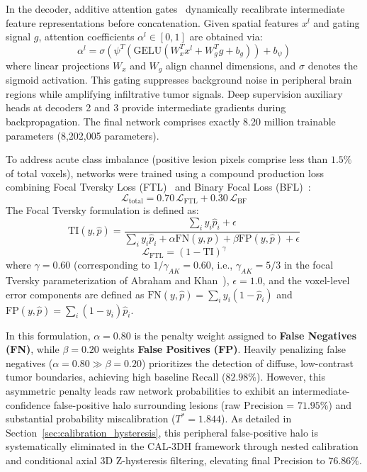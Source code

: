 \documentclass[11pt,a4paper]{article}
\begin{document}
In the decoder, additive attention gates~\cite{oktay2018attention} dynamically recalibrate intermediate feature representations before concatenation. Given spatial features $x^l$ and gating signal $g$, attention coefficients $\alpha^l \in [0, 1]$ are obtained via:
\begin{equation}
\alpha^l = \sigma\left(\psi^T \left(\text{GELU}\left(W_x^T x^l + W_g^T g + b_g\right)\right) + b_\psi\right)
\end{equation}
where linear projections $W_x$ and $W_g$ align channel dimensions, and $\sigma$ denotes the sigmoid activation. This gating suppresses background noise in peripheral brain regions while amplifying infiltrative tumor signals. Deep supervision auxiliary heads at decoders 2 and 3 provide intermediate gradients during backpropagation. The final network comprises exactly 8.20 million trainable parameters (8,202,005 parameters).

To address acute class imbalance (positive lesion pixels comprise less than $1.5\%$ of total voxels), networks were trained using a compound production loss combining Focal Tversky Loss (FTL)~\cite{salehi2017tversky,abraham2019novel} and Binary Focal Loss (BFL)~\cite{lin2017focal}:
\begin{equation}
\mathcal{L}_{\text{total}} = 0.70\,\mathcal{L}_{\text{FTL}} + 0.30\,\mathcal{L}_{\text{BF}}
\end{equation}
The Focal Tversky formulation is defined as:
\begin{equation}
\text{TI}(y, \hat{p}) = \frac{\sum_i y_i \hat{p}_i + \epsilon}{\sum_i y_i \hat{p}_i + \alpha \text{FN}(y, \hat{p}) + \beta \text{FP}(y, \hat{p}) + \epsilon}
\end{equation}
\begin{equation}
\mathcal{L}_{\text{FTL}} = (1 - \text{TI})^\gamma
\end{equation}
where $\gamma = 0.60$ (corresponding to $1/\gamma_{AK} = 0.60$, i.e., $\gamma_{AK} = 5/3$ in the focal Tversky parameterization of Abraham and Khan~\cite{abraham2019novel}), $\epsilon = 1.0$, and the voxel-level error components are defined as $\text{FN}(y, \hat{p}) = \sum_i y_i(1 - \hat{p}_i)$ and $\text{FP}(y, \hat{p}) = \sum_i (1 - y_i)\hat{p}_i$.

In this formulation, $\alpha = 0.80$ is the penalty weight assigned to \textbf{False Negatives (FN)}, while $\beta = 0.20$ weights \textbf{False Positives (FP)}. Heavily penalizing false negatives ($\alpha = 0.80 \gg \beta = 0.20$) prioritizes the detection of diffuse, low-contrast tumor boundaries, achieving high baseline Recall ($82.98\%$). However, this asymmetric penalty leads raw network probabilities to exhibit an intermediate-confidence false-positive halo surrounding lesions (raw Precision = $71.95\%$) and substantial probability miscalibration ($T^* = 1.844$). As detailed in Section~\ref{sec:calibration_hysteresis}, this peripheral false-positive halo is systematically eliminated in the CAL-3DH framework through nested calibration and conditional axial 3D Z-hysteresis filtering, elevating final Precision to $76.86\%$.
\end{document}
